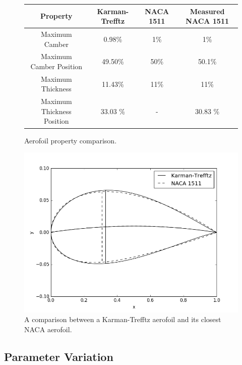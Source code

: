 \documentclass[10pt,a4paper]{article}
\begin{document}
\begin{figure}[!htb]
\begin{center}
\begin{tabular}{|c c c c|}
\hline
Property & Karman-Trefftz & NACA 1511 & Measured NACA 1511\\
\hline
Maximum Camber & 0.98\% & 1\% & 1\% \\
Maximum Camber Position & 49.50\% & 50\% & 50.1\% \\
Maximum Thickness & 11.43\% & 11\% & 11\%\\
Maximum Thickness Position & 33.03 \% & - & 30.83 \% \\
\hline
\end{tabular}
\end{center}
\caption{Aerofoil property comparison.}
\label{fig:aerofoil property comparison}
\end{figure}
\begin{figure}[!htb]
\centering
\includegraphics[scale=0.6]{Figures/ktreff_naca_comparison.png}
\caption{A comparison between a Karman-Trefftz aerofoil and its closest NACA aerofoil.}
\label{fig:ktreff_naca_comparison}
\end{figure}
\subsection{Parameter Variation}
\end{document}

